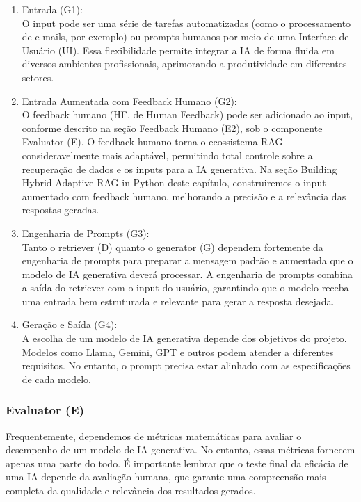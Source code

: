 \documentclass[a4paper, 12pt]{article}
\begin{document}
    \begin{enumerate}
        \item Entrada (G1):\\
        O input pode ser uma série de tarefas automatizadas (como o processamento de e-mails, por exemplo) ou prompts humanos por meio de uma Interface de Usuário (UI). Essa flexibilidade permite integrar a IA de forma fluida em diversos ambientes profissionais, aprimorando a produtividade em diferentes setores.
        \item Entrada Aumentada com Feedback Humano (G2):\\
        O feedback humano (HF, de Human Feedback) pode ser adicionado ao input, conforme descrito na seção Feedback Humano (E2), sob o componente Evaluator (E). O feedback humano torna o ecossistema RAG consideravelmente mais adaptável, permitindo total controle sobre a recuperação de dados e os inputs para a IA generativa. Na seção Building Hybrid Adaptive RAG in Python deste capítulo, construiremos o input aumentado com feedback humano, melhorando a precisão e a relevância das respostas geradas.
        \item Engenharia de Prompts (G3):\\
        Tanto o retriever (D) quanto o generator (G) dependem fortemente da engenharia de prompts para preparar a mensagem padrão e aumentada que o modelo de IA generativa deverá processar. A engenharia de prompts combina a saída do retriever com o input do usuário, garantindo que o modelo receba uma entrada bem estruturada e relevante para gerar a resposta desejada.
        \item Geração e Saída (G4):\\
        A escolha de um modelo de IA generativa depende dos objetivos do projeto. Modelos como Llama, Gemini, GPT e outros podem atender a diferentes requisitos. No entanto, o prompt precisa estar alinhado com as especificações de cada modelo.
    \end{enumerate}

    \subsubsection{Evaluator (E)}

    Frequentemente, dependemos de métricas matemáticas para avaliar o desempenho de um modelo de IA generativa. No entanto, essas métricas fornecem apenas uma parte do todo. É importante lembrar que o teste final da eficácia de uma IA depende da avaliação humana, que garante uma compreensão mais completa da qualidade e relevância dos resultados gerados.
\end{document}
